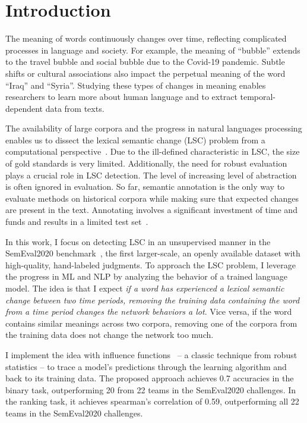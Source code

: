 \section{Introduction}

The meaning of words continuously changes over time, reflecting complicated processes in language and society. 
For example, the meaning of ``bubble'' extends to the travel bubble and social bubble due to the Covid-19 pandemic.
Subtle shifts or cultural associations also impact the perpetual meaning of the word ``Iraq'' and ``Syria''.
Studying these types of changes in meaning enables researchers to learn more about human language and to extract temporal-dependent data from texts.

The availability of large corpora and the progress in natural languages processing enables us to dissect the lexical semantic change (LSC) problem from a computational perspective~\cite{diachronic-survey}.
Due to the ill-defined characteristic in LSC, the size of gold standards is very limited.
Additionally, the need for robust evaluation plays a crucial role in LSC detection. 
The level of increasing level of abstraction is often ignored in evaluation. 
So far, semantic annotation is the only way to evaluate methods on historical corpora while making sure that expected changes are present in the text. 
Annotating involves a significant investment of time and funds and results in a limited test set~\cite{challenges_lsc}.


In this work, I focus on detecting LSC in an unsupervised manner in the SemEval2020 benchmark~\cite{semeval2020}, the first larger-scale, an openly available dataset with high-quality, hand-labeled judgments.
To approach the LSC problem, I leverage the progress in ML and NLP by analyzing the behavior of a trained language model.
The idea is that I expect \textit{if a word has experienced a lexical semantic change between two time periods, removing the training data containing the word from a time period changes the network behaviors a lot}.
Vice versa, if the word contains similar meanings across two corpora, removing one of the corpora from the training data does not change the network too much.

I implement the idea with influence functions~\cite{influence_fn} -- a classic technique from robust statistics -- to trace a model's predictions through the learning algorithm and back to its training data.
The proposed approach achieves 0.7 accuracies in the binary task, outperforming 20 from 22 teams in the SemEval2020 challenges.
In the ranking task, it achieves spearman's correlation of 0.59, outperforming all 22 teams in the SemEval2020 challenges.

